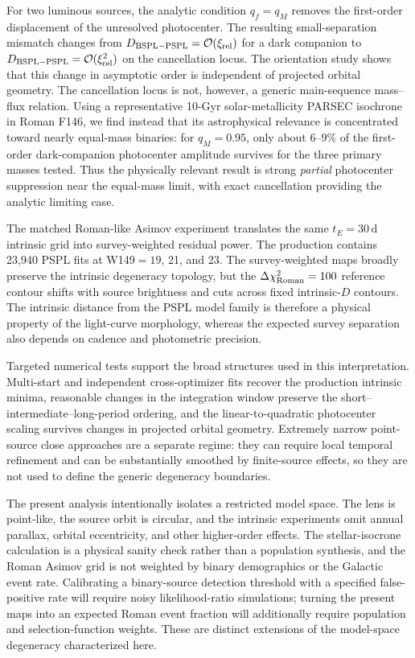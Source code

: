 \documentclass{article}
\begin{document}
For two luminous sources, the analytic condition $q_f=q_M$ removes the
first-order displacement of the unresolved photocenter. The resulting
small-separation mismatch changes from
$D_{\rm BSPL-PSPL}=\mathcal{O}(\xi_{\rm rel})$ for a dark companion to
$D_{\rm BSPL-PSPL}=\mathcal{O}(\xi_{\rm rel}^2)$ on the cancellation
locus. The orientation study shows that this change in asymptotic order
is independent of projected orbital geometry. The cancellation locus is
not, however, a generic main-sequence mass--flux relation. Using a
representative 10-Gyr solar-metallicity PARSEC isochrone in Roman F146,
we find instead that its astrophysical relevance is concentrated toward
nearly equal-mass binaries: for $q_M=0.95$, only about $6$--$9\%$ of the
first-order dark-companion photocenter amplitude survives for the three
primary masses tested. Thus the physically relevant result is strong
\emph{partial} photocenter suppression near the equal-mass limit, with
exact cancellation providing the analytic limiting case.

The matched Roman-like Asimov experiment translates the same
$t_E=30\,$d intrinsic grid into survey-weighted residual power. The
production contains 23,940 PSPL fits at W149$=19$, 21, and 23. The
survey-weighted maps broadly preserve the intrinsic degeneracy topology,
but the $\Delta\chi^2_{\rm Roman}=100$ reference contour shifts with
source brightness and cuts across fixed intrinsic-$D$ contours. The
intrinsic distance from the PSPL model family is therefore a physical
property of the light-curve morphology, whereas the expected survey
separation also depends on cadence and photometric precision.

Targeted numerical tests support the broad structures used in this
interpretation. Multi-start and independent cross-optimizer fits recover
the production intrinsic minima, reasonable changes in the integration
window preserve the short--intermediate--long-period ordering, and the
linear-to-quadratic photocenter scaling survives changes in projected
orbital geometry. Extremely narrow point-source close approaches are a
separate regime: they can require local temporal refinement and can be
substantially smoothed by finite-source effects, so they are not used to
define the generic degeneracy boundaries.

The present analysis intentionally isolates a restricted model space.
The lens is point-like, the source orbit is circular, and the intrinsic
experiments omit annual parallax, orbital eccentricity, and other
higher-order effects. The stellar-isocrone calculation is a physical
sanity check rather than a population synthesis, and the Roman Asimov
grid is not weighted by binary demographics or the Galactic event rate.
Calibrating a binary-source detection threshold with a specified
false-positive rate will require noisy likelihood-ratio simulations;
turning the present maps into an expected Roman event fraction will
additionally require population and selection-function weights. These
are distinct extensions of the model-space degeneracy characterized
here.
\end{document}
